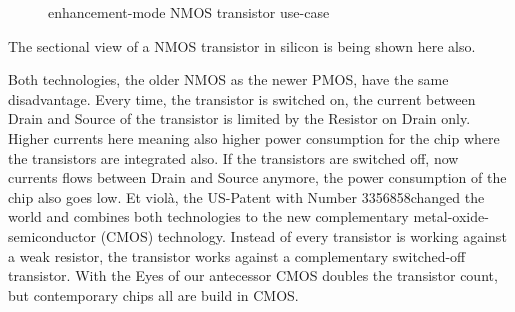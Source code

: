 \begin{center}
    \begin{figure}[h] \caption{enhancement-mode NMOS transistor use-case}
        \begin{circuitdiagram}[draft*]{20}{20}
        \end{circuitdiagram}
    \end{figure}
\end{center}

The sectional view of a NMOS transistor in silicon is being shown here also.
\begin{center}
\end{center}

Both technologies, the older NMOS as the newer PMOS, have the same disadvantage. Every time, the transistor is switched on, the current between Drain and Source of the transistor is limited by the Resistor on Drain only. Higher currents here meaning also higher power consumption for the chip where the transistors are integrated also. If the transistors are switched off, now currents flows between Drain and Source anymore, the power consumption of the chip also goes low.
Et violà, the US-Patent with Number 3356858\footnotemark changed the world and combines both technologies to the new complementary metal-oxide-semiconductor (CMOS) technology. Instead of every transistor is working against a weak resistor, the transistor works against a complementary switched-off transistor. With the Eyes of our antecessor CMOS doubles the transistor count, but contemporary chips all are build in CMOS.

